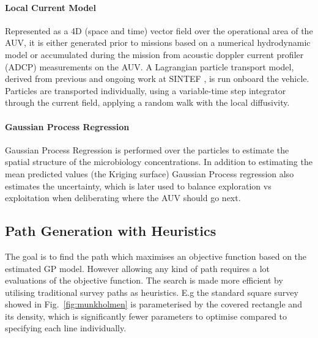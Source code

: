 \documentclass[conference]{IEEEtran}
\newcommand{\cmt}[1]{{\color{red}{#1}}}
\begin{document}
\paragraph{Local Current Model}
Represented as a 4D (space and time) vector field over the operational
area of the AUV, it is either generated prior to missions based on a
numerical hydrodynamic model
or accumulated during the mission from acoustic doppler current
profiler (ADCP) measurements on the AUV.  A Lagrangian particle
transport model, derived from previous and ongoing work at SINTEF
\cite{Rye2006}, is run onboard the vehicle.  Particles are transported
individually, using a variable-time step
integrator %
through the current field, applying a random walk with the local
diffusivity.

\paragraph{Gaussian Process Regression} 
Gaussian Process Regression is performed over the particles to estimate the spatial structure of the microbiology concentrations.
In addition to estimating the mean predicted values (the Kriging surface)
Gaussian Process regression also estimates the uncertainty, which is
later used to balance exploration vs exploitation when deliberating
where the AUV should go next.

\subsection{Path Generation with Heuristics}
The goal is to find the path which maximises an objective function
based on the estimated GP model.
However allowing any kind
of path requires a lot evaluations of the objective function. The
search is made more efficient by utilising traditional survey paths as
heuristics. E.g the standard square survey showed in
Fig.~\ref{fig:munkholmen} is parameterised by the covered rectangle
and its density, which is significantly fewer parameters to optimise
compared to specifying each line individually.
\end{document}

